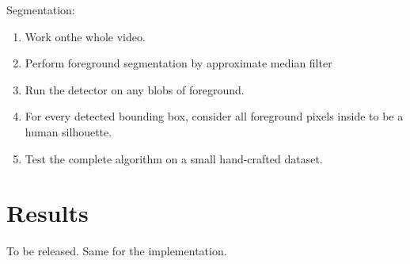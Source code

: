 \documentclass{article}
\begin{document}
Segmentation:
\begin{enumerate}
\item{Work onthe whole video.}
\item{Perform foreground segmentation by approximate median filter\cite{amf}}
\item{Run the detector on any blobs of foreground.}
\item{For every detected bounding box, consider all foreground pixels inside to be a human silhouette.}
\item{Test the complete algorithm on a small hand-crafted dataset.}
\end{enumerate}


\section{Results}
To be released.
Same for the implementation.


\printbibliography
\end{document}

